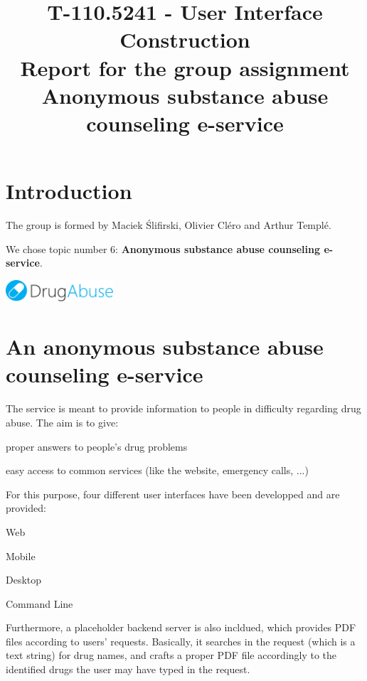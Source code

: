 \documentclass[a4paper,12pt, twocolumn]{article}
\title{  {\Large T-110.5241 - User Interface Construction}\\
		\textbf{Report for the group assignment}\\
		Anonymous substance abuse counseling e-service
	}
\newenvironment{my_itemize}{
\begin{itemize}
	\setlength{\topsep}{0pt}
	\setlength{\itemsep}{3pt}
	\setlength{\parskip}{0pt}
	\setlength{\parsep}{0pt}}
{\end{itemize}
}
\newenvironment{my_enumerate}{
\begin{enumerate}
     \setlength{\itemsep}{3pt}
     \setlength{\parskip}{0pt}
     \setlength{\parsep}{0pt}}
{\end{enumerate}
}
\begin{document}
\maketitle\thispagestyle{fancy}


\section*{Introduction}

The group is formed by Maciek \'{S}lifirski, Olivier Cl\'{e}ro and Arthur Templ\'{e}.

We chose topic number 6: \textbf{Anonymous substance abuse counseling e-service}.\\
\begin{center}
\includegraphics[width=0.3\textwidth]{images/logo_with_text.pdf}
\label{cli_1}
\end{center}
\section*{An anonymous substance abuse counseling e-service}

The service is meant to provide information to people in difficulty regarding drug abuse.
The aim is to give:
\begin{my_enumerate}
 \item proper answers to people's drug problems
 \item easy access to common services (like the website, emergency calls, ...)
\end{my_enumerate}
For this purpose, four different user interfaces have been developped and are provided:
\begin{my_itemize}
 \item Web
 \item Mobile
 \item Desktop
 \item Command Line
\end{my_itemize}
Furthermore, a placeholder backend server is also incldued, which provides PDF files according to users' requests. Basically, it searches in the request (which is a text string) for drug names, and crafts a proper PDF file accordingly to the identified drugs the user may have typed in the request.
\end{document}
